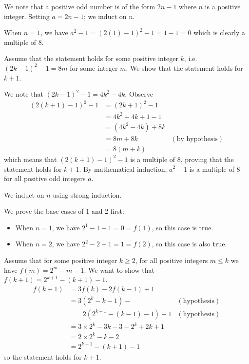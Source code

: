 \begin{questions}
    \item We note that a positive odd number is of the form $2n - 1$ where $n$ is a positive integer. Setting $a = 2n - 1$; we induct on $n$.
    
    When $n = 1$, we have $a^2 - 1 = (2(1) - 1)^2 - 1 = 1 - 1 = 0$ which is clearly a multiple of 8.
    
    Assume that the statement holds for some positive integer $k$, i.e. $(2k-1)^2 - 1 = 8m$ for some integer $m$. We show that the statement holds for $k + 1$.
    
    We note that $(2k-1)^2 - 1 = 4k^2 - 4k$. Observe
    \begin{align*}
        (2(k+1)-1)^2 - 1 &= (2k+1)^2 - 1\\
        &= 4k^2 + 4k + 1 - 1\\
        &= (4k^2 - 4k) + 8k\\
        &= 8m + 8k & (\text{by hypothesis})\\
        &= 8(m+k)
    \end{align*}
    which means that $(2(k+1)-1)^2 - 1$ is a multiple of 8, proving that the statement holds for $k+1$. By mathematical induction, $a^2 - 1$ is a multiple of 8 for all positive odd integers $a$.
    
    \item We induct on $n$ using strong induction.
    
    We prove the base cases of 1 and 2 first:
    \begin{itemize}
        \item When $n = 1$, we have $2^1 - 1 - 1 = 0 = f(1)$, so this case is true.
        \item When $n = 2$, we have $2^2 - 2 - 1 = 1 = f(2)$, so this case is also true.
    \end{itemize}
    
    Assume that for some positive integer $k \geq 2$, for all positive integers $m \leq k$ we have $f(m) = 2^m - m - 1$. We want to show that $f(k+1) = 2^{k+1} - (k+1) - 1$.
    \begin{align*}
        f(k+1) &= 3f(k) - 2f(k-1) + 1\\
        &= 3(2^k - k - 1) - & (\text{hypothesis})\\
        &\quad\quad2(2^{k-1} - (k-1) - 1) + 1 & (\text{hypothesis}) \\
        &= 3\times 2^k - 3k - 3 -2^k + 2k + 1\\
        &= 2\times2^k - k - 2\\
        &= 2^{k+1} - (k+1) - 1
    \end{align*}
    so the statement holds for $k+1$.
    

\end{questions}
